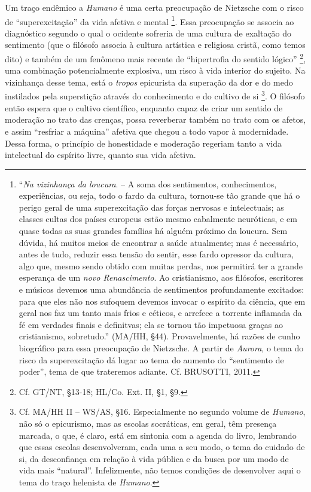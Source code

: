 \documentclass[
	12pt,				%
	openright,			%
	oneside,			%
	a4paper,			%
	english,			%
	french,				%
	spanish,			%
	brazil				%
	]{abntex2}
\begin{document}
	Um traço endêmico a \textit{Humano} é uma certa preocupação de Nietzsche com o risco de “superexcitação” da vida afetiva e mental
\footnote{“\textit{Na vizinhança da loucura}. – A soma dos sentimentos, conhecimentos, experiências, ou seja, todo o fardo da cultura, tornou-se tão grande que há o perigo geral de uma superexcitação das forças nervosas e intelectuais; as classes cultas dos países europeus estão mesmo cabalmente neuróticas, e em quase todas as suas grandes famílias há alguém próximo da loucura. Sem dúvida, há muitos meios de encontrar a saúde atualmente; mas é necessário, antes de tudo, reduzir essa tensão do sentir, esse fardo opressor da cultura, algo que, mesmo sendo obtido com muitas perdas, nos permitirá ter a grande esperança de um \textit{novo Renascimento}. Ao cristianismo, aos filósofos, escritores e músicos devemos uma abundância de sentimentos profundamente excitados: para que eles não nos sufoquem devemos invocar o espírito da ciência, que em geral nos faz um tanto mais frios e céticos, e arrefece a torrente inflamada da fé em verdades finais e definitvas; ela se tornou tão impetuosa graças ao cristianismo, sobretudo.” (MA/HH, §44). Provavelmente, há razões de cunho biográfico para essa preocupação de Nietzsche. A partir de \textit{Aurora}, o tema do risco da superexcitação dá lugar ao tema do aumento do “sentimento de poder”, tema de que trateremos adiante. Cf. BRUSOTTI, 2011.}. 
Essa preocupação se associa ao diagnóstico segundo o qual o ocidente sofreria de uma cultura de exaltação do sentimento (que o filósofo associa à cultura artística e religiosa cristã, como temos dito) e também de um fenômeno mais recente de “hipertrofia do sentido lógico”
\footnote{Cf. GT/NT, §13-18; HL/Co. Ext. II, §1, §9.}, 
uma combinação potencialmente explosiva, um risco à vida interior do sujeito. Na vizinhança desse tema, está o \textit{tropos} epicurista da superação da dor e do medo instilados pela superstição através do conhecimento e do cultivo de si
\footnote{Cf. MA/HH II – WS/AS, §16. Especialmente no segundo volume de \textit{Humano}, não só o epicurismo, mas as escolas socráticas, em geral, têm presença marcada, o que, é claro, está em sintonia com a agenda do livro, lembrando que essas escolas desenvolveram, cada uma a seu modo, o tema do cuidado de si, da desconfiança em relação à vida pública e da busca por um modo de vida mais “natural”. Infelizmente, não temos condições de desenvolver aqui o tema do traço helenista de \textit{Humano}.}. 
O filósofo então espera que o cultivo científico, enquanto capaz de criar um sentido de moderação no trato das crenças, possa reverberar também no trato com os afetos, e assim “resfriar a máquina” afetiva que chegou a todo vapor à modernidade. Dessa forma, o princípio de honestidade e moderação regeriam tanto a vida intelectual do espírito livre, quanto sua vida afetiva. 
\end{document}
